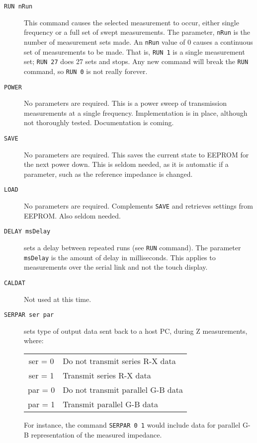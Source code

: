 \begin{description}
\item[\texttt{RUN nRun}]
This command causes the selected measurement to occur, either single frequency or a full set of swept measurements.  The parameter, \texttt{nRun} is the number of measurement sets made.  An \texttt{nRun} value of 0 causes a continuous set of measurements to be made.  That is, \texttt{RUN 1} is a single measurement set;  \texttt{RUN 27} does 27 sets and stops.  Any new command will break the \texttt{RUN} command, so \texttt{RUN 0} is not really forever.

\item[\texttt{POWER}] No parameters are required.  This is a power sweep of transmission measurements at a single frequency.  Implementation is in place, although not thoroughly tested.  Documentation is coming.

\item[\texttt{SAVE}]   No parameters are required.  This saves the current state to \mbox{EEPROM} for the next power down.  This is seldom needed, as it is automatic if a parameter, such as the reference impedance is changed.

\item[\texttt{LOAD}]   No parameters are required.  Complements \texttt{SAVE} and retrieves settings from EEPROM.  Also seldom needed.

\item[\texttt{DELAY msDelay}]   sets a delay between repeated runs (see \texttt{RUN} command).  The parameter \texttt{msDelay} is the amount of delay in milliseconds.  This applies to measurements over the serial link and not the touch display.

\item[\texttt{CALDAT}]  Not used at this time.

\item[\texttt{SERPAR ser par}] sets type of output data sent back to a host PC, during Z measurements, where:
\begin{center}
\begin{tabular}{c l}
ser = 0 & Do not transmit series R-X data \\
ser = 1 & Transmit series R-X data \\
par = 0 & Do not transmit parallel G-B data \\
par = 1 & Transmit parallel G-B data \\
\end{tabular}
\end{center}

For instance, the command \texttt{SERPAR 0 1} would include data for parallel G-B representation of the measured impedance.


\end{description}
